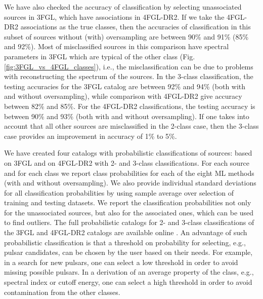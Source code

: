 \documentclass{aa}
\begin{document}
We have also checked the accuracy of classification by selecting unassociated sources in 3FGL, which have associations in 4FGL-DR2.
If we take the 4FGL-DR2 associations as the true classes, then the accuracies of classification in this subset of sources 
without (with) oversampling are between 90\% and 91\% (85\% and 92\%).
Most of misclassified sources in this comparison have spectral parameters in 3FGL which are typical of the other class (Fig. \ref{fig:3FGL_vs_4FGL_classes}), i.e.,  the misclassification can be due to problems with reconstructing the spectrum of the sources.
In the 3-class classification, the testing accuracies for the 3FGL catalog are between 92\% and 94\% (both with and without oversampling), while comparison with 4FGL-DR2 give accuracy between 82\% and 85\%. For the 4FGL-DR2 classifications, the testing accuracy is between 90\% and 93\% (both with and without oversampling). If one takes into account that all other sources are misclassified in the 2-class case, then the 3-class case provides an improvement in accuracy of 1\% to 5\%.

We have created four catalogs with probabilistic classifications of sources: based on 3FGL and on 4FGL-DR2 with 2- and 3-class classifications.
For each source and for each class we report class probabilities for each of the eight ML methods (with and without oversampling). 
We also provide individual standard deviations for all classification probabilities by using sample average over selection of training and testing datasets.
We report the classification probabilities not only for the unassociated sources, but also for the associated ones, which can be used to find outliers.
The full probabilistic catalogs for 2- and 3-class classifications of the 3FGL and 4FGL-DR2 catalogs are available online \citep{SOM_material}.
An advantage of such probabilistic classification is that a threshold on probability for selecting, e.g., pulsar candidates, can be chosen by the user based on their needs.
For example, in a search for new pulsars, one can select a low threshold in order to avoid missing possible pulsars.
In a derivation of an average property of the class, e.g., spectral index or cutoff energy, one can select a high threshold in order to avoid contamination from the other classes.
\end{document}
